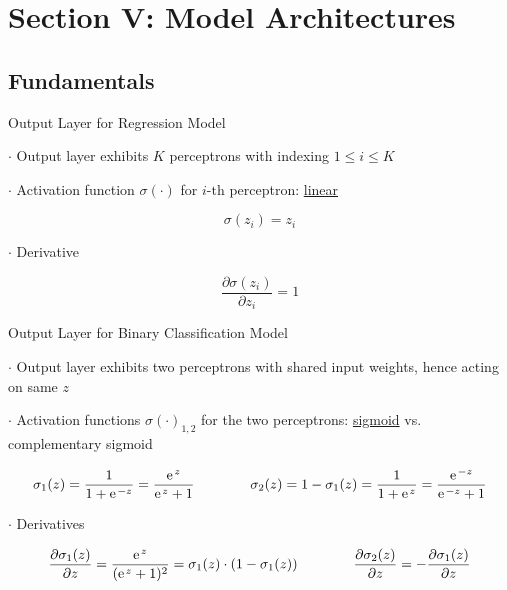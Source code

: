 \documentclass[mathserif, aspectratio=1610]{intbeamer}
\begin{document}


\section{Section V: Model Architectures}

\subsection{Fundamentals}

\begin{frame}[t]{Output Layer for Regression Model}

$\cdot$ Output layer exhibits $K$ perceptrons with indexing $1 \leq i \leq K$

$\cdot$ Activation function $\sigma(\cdot)$ for $i\text{-th}$ perceptron: \underline{linear}

$$\sigma(z_i) = z_i$$

$\cdot$ Derivative

$$\frac{\partial \sigma(z_i)}{\partial z_i} = 1$$

\end{frame}



\begin{frame}[t]{Output Layer for Binary Classification Model}

$\cdot$ Output layer exhibits two perceptrons with shared input weights, hence acting on same $z$

$\cdot$ Activation functions $\sigma(\cdot)_{1,2}$ for the two perceptrons: \underline{sigmoid} vs. complementary sigmoid

$$\sigma_1(z) = \frac{1}{1+\e^{-z}} = \frac{\e^{z}}{\e^{z}+1} \qquad\qquad \sigma_2(z) = 1-\sigma_1(z) = \frac{1}{1 + \e^{z}} = \frac{\e^{-z}}{\e^{-z}+1}$$

\begin{center}
\end{center}

$\cdot$ Derivatives

$$\frac{\partial \sigma_1(z)}{\partial z} = \frac{\e^{z}}{(\e^{z}+1)^2} = \sigma_1(z) \cdot (1-\sigma_1(z)) \qquad\qquad \frac{\partial \sigma_2(z)}{\partial z} = - \frac{\partial \sigma_1(z)}{\partial z} $$

\end{frame}
\end{document}
